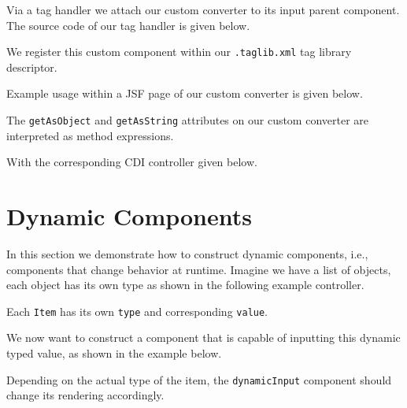 Via a tag handler we attach our custom converter to its input parent component.
The source code of our tag handler is given below.


We register this custom component within our \texttt{.taglib.xml} tag library descriptor.


Example usage within a JSF page of our custom converter is given below.

The \texttt{getAsObject} and \texttt{getAsString} attributes on our custom converter are interpreted as method expressions.

With the corresponding CDI controller given below.



\section{Dynamic Components}
In this section we demonstrate how to construct dynamic components, i.e., components that change behavior at runtime.
Imagine we have a list of objects, each object has its own type as shown in the following example controller.

Each \texttt{Item} has its own \texttt{type} and corresponding \texttt{value}.

We now want to construct a component that is capable of inputting this dynamic typed value, as shown in the example below.

Depending on the actual type of the item, the \texttt{dynamicInput} component should change its rendering accordingly.

